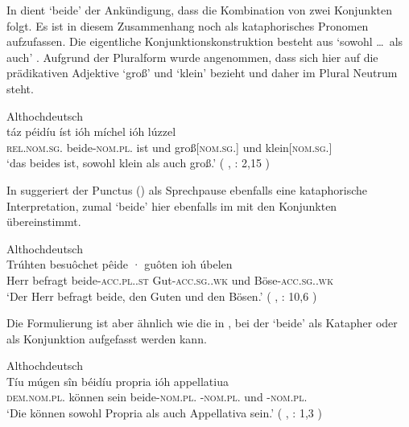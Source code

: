 
In  dient  `beide' der Ankündigung, dass die
Kombination von zwei Konjunkten folgt. Es ist in diesem Zusammenhang noch als
kataphorisches Pronomen aufzufassen. Die eigentliche Konjunktionskonstruktion
besteht aus  `sowohl \dots\ als auch'
\autocite[vgl.][169]{schuetzeichel2012}. Aufgrund der Pluralform wurde
angenommen, dass  sich hier auf die prädikativen
Adjektive  `groß' und  `klein'
bezieht und daher im Plural Neutrum steht.

\begin{exe}
\ex \label{ex:beidejohahd_1}
	\langinfo%
		{Althochdeutsch}%
		{}%
		{\cite[nach][57]{king1972}}\\
\gll táz péidíu íst ióh míchel ióh lúzzel \\
	\textsc{rel.nom.sg.\NeutI} beide-\textsc{nom.pl.\NeutI} ist und
	groß[\textsc{nom.sg.\NeutI}] und klein[\textsc{nom.sg.\NeutI}] \\
\trans `das beides ist, sowohl klein als auch groß.'
	(%
		, : 2,15%
	)
\end{exe}

In  suggeriert der Punctus () als Sprechpause
ebenfalls eine kataphorische Interpretation, zumal  `beide' hier
ebenfalls im  mit den Konjunkten übereinstimmt.

\begin{exe}
\ex \label{ex:beidejohahd_2}
	\langinfo%
		{Althochdeutsch}%
		{}%
		{\cite[nach][35]{tax1979}}\\
	\gll Trúhten besuôchet pêide · guôten ioh úbelen \\
		Herr befragt beide-\textsc{acc.pl.\MascA.st} {}
			Gut-\textsc{acc.sg.\MascA.wk} und
			Böse-\textsc{acc.sg.\MascA.wk} \\
	\trans `Der Herr befragt beide, den Guten und den Bösen.'
		(%
			, : 10,6%
		)
\end{exe}

Die Formulierung ist aber ähnlich wie die in , bei der
 `beide' als Katapher oder als Konjunktion aufgefasst
werden kann.

\begin{exe}
\ex \label{ex:beidejohahd_3}
	\langinfo%
		{Althochdeutsch}%
		{}%
		{\cite[nach][6]{king1972}}\\
	\gll Tíu múgen sîn béidíu propria ióh appellatiua \\
		\textsc{dem.nom.pl.\NeutI} können sein beide-\textsc{nom.pl.\NeutI}
			-\textsc{nom.pl.\NeutI} und
			-\textsc{nom.pl.\NeutI} \\
	\trans `Die können sowohl Propria als auch Appellativa sein.'
		(%
			, : 1,3%
		)
\end{exe}

